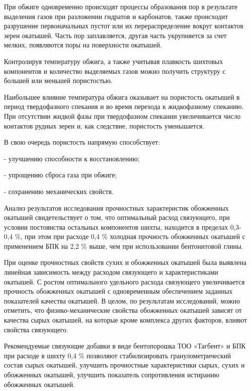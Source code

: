\begin{multicols}{2}
При обжиге одновременно происходят процессы образования пор в результате
выделения газов при разложении гидратов и карбонатов, также происходит
разрушение первоначальных пустот или их перераспределение вокруг
контактов зерен окатышей. Часть пор заплавляется, другая часть
укрупняется за счет мелких, появляются поры на поверхности окатышей.

Контролируя температуру обжига, а также учитывая плавкость шихтовых
компонентов и количество выделяемых газов можно получить структуру с
большей или меньшей пористостью.

Наибольшее влияние температура обжига оказывает на пористость окатышей в
период твердофазного спекания и во время перехода к жидкофазному
спеканию. При отсутствии жидкой фазы при твердофазном спекании
увеличивается число контактов рудных зерен и, как следствие, пористость
уменьшается.

В свою очередь пористость напрямую способствует:

- улучшению способности к восстановлению;

- упрощению сброса газа при обжиге;

- сохранению механических свойств.

Анализ результатов исследования прочностных характеристик обожженных
окатышей свидетельствует о том, что оптимальный расход связующего, при
условии постоянства остальных компонентов шихты, находится в пределах
0,3-0,4 \%, при этом при расходе 0,4 \% холодная прочность обожженных
окатышей с применением БПК на 2,2 \% выше, чем при использовании
бентонитовой глины.

При оценке прочностных свойств сухих и обожженных окатышей была выявлена
линейная зависимость между расходом связующего и характеристиками
окатышей. С ростом оптимального удельного расхода связующего
увеличивается прочность обожженных окатышей с одновременным обеспечением
заданных показателей качества окатышей. В целом, по результатам
исследований, можно отметить, что физико-механические свойства
обожженных окатышей зависят от качества сырых окатышей, на которые кроме
комплекса других факторов, влияют свойства связующего.

Рекомендуемые связующие добавки в виде бентопорошка ТОО «Тагбент» и БПК
при расходе в шихту 0,4 \% позволяют стабилизировать гранулометрический
состав сырых окатышей, улучшить прочностные характеристики сырых, сухих
и обожженных окатышей, улучшить показатель сопротивления истиранию
обожженных окатышей.
\end{multicols}

